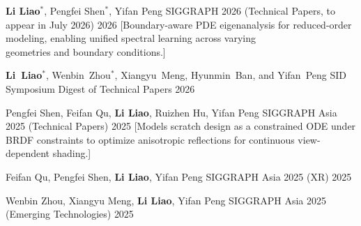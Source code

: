 \documentclass{resume}
\begin{document}
\begin{ResumePublications} %
              {\textbf{Li Liao$^{*}$}, Pengfei Shen$^{*}$, Yifan Peng}
              {SIGGRAPH 2026 (Technical Papers, to appear in July 2026)}
              {2026}
              [Boundary-aware PDE eigenanalysis for reduced-order modeling, enabling unified spectral learning across varying \\geometries and boundary conditions.]

              {\textbf{Li~Liao$^{*}$}, Wenbin~Zhou$^{*}$, Xiangyu~Meng, Hyunmin~Ban, and Yifan~Peng}
              {SID Symposium Digest of Technical Papers}
              {2026}

              {Pengfei Shen, Feifan Qu, \textbf{Li Liao}, Ruizhen Hu, Yifan Peng}
              {SIGGRAPH Asia 2025 (Technical Papers)}
              {2025}
              [Models scratch design as a constrained ODE under BRDF constraints to optimize anisotropic reflections for continuous view-dependent shading.]


              {Feifan Qu, Pengfei Shen, \textbf{Li Liao}, Yifan Peng}
              {SIGGRAPH Asia 2025 (XR)}
              {2025}

              {Wenbin Zhou, Xiangyu Meng, \textbf{Li Liao}, Yifan Peng}
              {SIGGRAPH Asia 2025 (Emerging Technologies)}
              {2025}

\end{ResumePublications}


        
\end{document}
